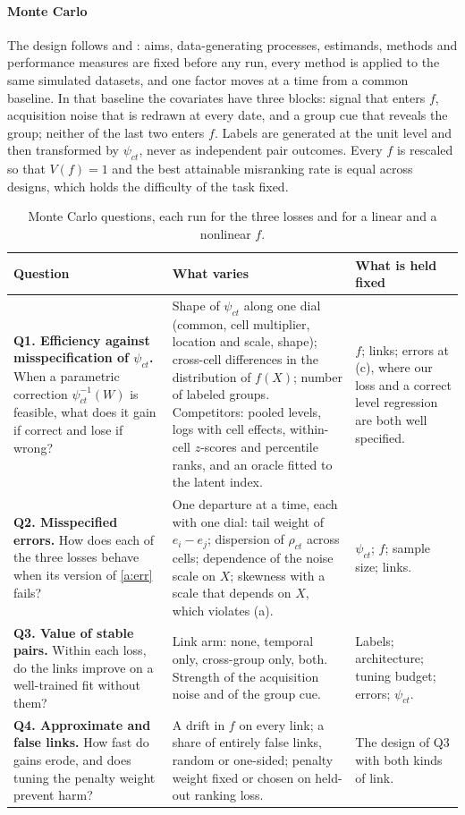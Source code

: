 \documentclass[11pt]{article}
\theoremstyle{tight}
\begin{document}
\paragraph{Monte Carlo}
The design follows \citet{morris2019} and \citet{kiviet2012}: aims, data-generating processes,
estimands, methods and performance measures are fixed before any run, every method is applied to
the same simulated datasets, and one factor moves at a time from a common baseline. In that
baseline the covariates have three blocks: signal that enters $f$, acquisition noise that is
redrawn at every date, and a group cue that reveals the group; neither of the last two enters
$f$. Labels are generated at the unit level and then transformed by $\psi_{ct}$, never as
independent pair outcomes. Every $f$ is rescaled so that $V(f)=1$ and the best attainable
misranking rate is equal across designs, which holds the difficulty of the task fixed.

\begin{table}[h]
\centering\footnotesize
\renewcommand{\arraystretch}{1.12}
\begin{tabularx}{\textwidth}{@{}>{\raggedright\arraybackslash}p{} Y >{\raggedright\arraybackslash}p{0.22\textwidth}@{}}
\toprule
Question & What varies & What is held fixed \\
\midrule
\textbf{Q1. Efficiency against misspecification of $\psi_{ct}$.} When a parametric correction
$\psi_{ct}^{-1}(W)$ is feasible, what does it gain if correct and lose if wrong?
& Shape of $\psi_{ct}$ along one dial (common, cell multiplier, location and scale, shape);
cross-cell differences in the distribution of $f(X)$; number of labeled groups. Competitors:
pooled levels, logs with cell effects, within-cell $z$-scores and percentile ranks, and an
oracle fitted to the latent index.
& $f$; links; errors at (c), where our loss and a correct level regression are both well
specified. \\
\addlinespace
\textbf{Q2. Misspecified errors.} How does each of the three losses behave when its version of
\ref{a:err} fails?
& One departure at a time, each with one dial: tail weight of $e_i-e_j$; dispersion of
$\rho_{ct}$ across cells; dependence of the noise scale on $X$; skewness with a scale that
depends on $X$, which violates (a).
& $\psi_{ct}$; $f$; sample size; links. \\
\addlinespace
\textbf{Q3. Value of stable pairs.} Within each loss, do the links improve on a well-trained
fit without them?
& Link arm: none, temporal only, cross-group only, both. Strength of the acquisition noise and
of the group cue.
& Labels; architecture; tuning budget; errors; $\psi_{ct}$. \\
\addlinespace
\textbf{Q4. Approximate and false links.} How fast do gains erode, and does tuning the
penalty weight prevent harm?
& A drift in $f$ on every link; a share of entirely false links, random or one-sided; penalty
weight fixed or chosen on held-out ranking loss.
& The design of Q3 with both kinds of link. \\
\bottomrule
\end{tabularx}
\caption{Monte Carlo questions, each run for the three losses and for a linear and a nonlinear
$f$.}
\label{tab:mc}
\end{table}
\end{document}

